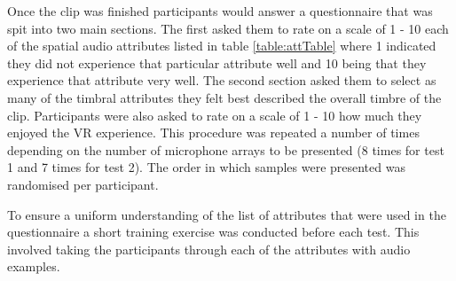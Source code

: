 		Once the clip was finished participants would answer a questionnaire that was spit into two main sections. The first asked them to rate on a scale of 1 - 10 each of the spatial audio attributes listed in table \ref{table:attTable} where 1 indicated they did not experience that particular attribute well and 10 being that they experience that attribute very well. The second section asked them to select as many of the timbral attributes they felt best described the overall timbre of the clip. Participants were also asked to rate on a scale of 1 - 10 how much they enjoyed the VR experience. This procedure was repeated a number of times depending on the number of microphone arrays to be presented (8 times for test 1 and 7 times for test 2). The order in which samples were presented was randomised per participant.

		To ensure a uniform understanding of the list of attributes that were used in the questionnaire a short training exercise was conducted before each test. This involved taking the participants through each of the attributes with audio examples. 

